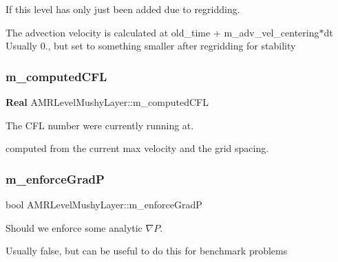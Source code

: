 If this level has only just been added due to regridding. 

The advection velocity is calculated at old\+\_\+time + m\+\_\+adv\+\_\+vel\+\_\+centering$\ast$dt Usually 0., but set to something smaller after regridding for stability \mbox{\label{class_a_m_r_level_mushy_layer_aa7a6e8a5cb2cb6f690c047e46d70547f}} 
\subsubsection{\texorpdfstring{m\+\_\+computed\+C\+FL}{m\_computedCFL}}
{\footnotesize\ttfamily \textbf{ Real} A\+M\+R\+Level\+Mushy\+Layer\+::m\+\_\+computed\+C\+FL\hspace{0.3cm}{\ttfamily [protected]}}



The C\+FL number we\textquotesingle{}re currently running at. 

computed from the current max velocity and the grid spacing. \mbox{\label{class_a_m_r_level_mushy_layer_a731a16b4dfaecb9235357b88e251af97}} 
\subsubsection{\texorpdfstring{m\+\_\+enforce\+GradP}{m\_enforceGradP}}
{\footnotesize\ttfamily bool A\+M\+R\+Level\+Mushy\+Layer\+::m\+\_\+enforce\+GradP\hspace{0.3cm}{\ttfamily [protected]}}



Should we enforce some analytic $ \nabla P $. 

Usually false, but can be useful to do this for benchmark problems \mbox{\label{class_a_m_r_level_mushy_layer_a49000dfb8d30dc44b35fc1c802c9fd4c}} 
